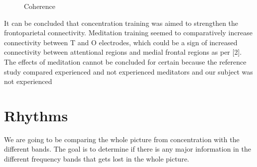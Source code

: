 \begin{figure}[h!]
\centering
{}
\caption{Coherence}
\end{figure}


\par It can be concluded that concentration training was aimed to strengthen the frontoparietal connectivity. Meditation training seemed to comparatively increase connectivity between T and O electrodes, which could be a sign of increased connectivity between attentional regions and medial frontal regions as per [2]. The effects of meditation cannot be concluded for certain because the reference study compared experienced and not experienced meditators and our subject was not experienced









\section{Rhythms}

We are going to be comparing the whole picture from concentration with the different bands. The goal is to determine if there is any major information in the different frequency bands that gets lost in the whole picture.



